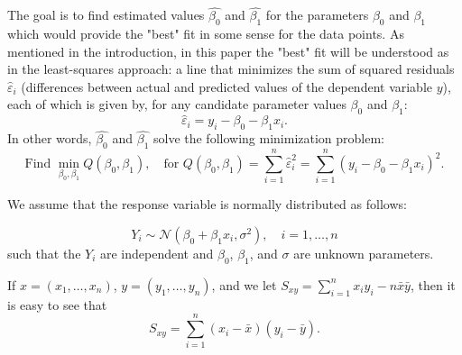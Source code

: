 \documentclass[12pt,a4paper,oneside]{book} %
\begin{document}
The goal is to find estimated values $\hat{\beta_0}$ and $\hat{\beta_1}$ for the parameters $\beta_0$ and $\beta_1$ which would provide the "best" fit in some sense for the data points. As mentioned in the introduction, in this paper the "best" fit will be understood as in the least-squares approach: a line that minimizes the sum of squared residuals $\hat{\varepsilon}_i$ (differences between actual and predicted values of the dependent variable $y$), each of which is given by, for any candidate parameter values $\beta_0$ and $\beta_1$:
\[
\hat{\varepsilon}_i = y_i - \beta_0 - \beta_1 x_i.
\]
In other words, $\hat{\beta_0}$ and $\hat{\beta_1}$ solve the following minimization problem:
\[
\text{Find } \min_{\beta_0, \beta_1} Q(\beta_0, \beta_1), \quad \text{for } Q(\beta_0, \beta_1) = \sum_{i=1}^{n} \hat{\varepsilon}_i^2 = \sum_{i=1}^{n} (y_i - \beta_0 - \beta_1 x_i)^2.
\]

We assume that the response variable is normally distributed as follows: 

\[ Y_i \sim \mathcal{N}(\beta_0 + \beta_1 x_i, \sigma^2), \quad i = 1, \ldots, n \]
such that the \(Y_i\) are independent and \(\beta_0\), \(\beta_1\), and \(\sigma\) are unknown parameters.

If $x = (x_1, \ldots, x_n)$, $y = (y_1, \ldots, y_n)$, and we let $S_{xy} = \sum_{i=1}^{n} x_i y_i - n\bar{x}\bar{y}$, then it is easy to see that
\[ S_{xy} = \sum_{i=1}^{n} (x_i - \bar{x})(y_i - \bar{y}). \]
\end{document}
